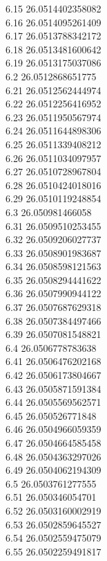 {6.15	26.0514402358082\\
6.16	26.0514095261409\\
6.17	26.0513788342172\\
6.18	26.0513481600642\\
6.19	26.0513175037086\\
6.2	26.0512868651775\\
6.21	26.0512562444974\\
6.22	26.0512256416952\\
6.23	26.0511950567974\\
6.24	26.0511644898306\\
6.25	26.0511339408212\\
6.26	26.0511034097957\\
6.27	26.0510728967804\\
6.28	26.0510424018016\\
6.29	26.0510119248854\\
6.3	26.050981466058\\
6.31	26.0509510253455\\
6.32	26.0509206027737\\
6.33	26.0508901983687\\
6.34	26.0508598121563\\
6.35	26.0508294441622\\
6.36	26.0507990944122\\
6.37	26.0507687629318\\
6.38	26.0507384497466\\
6.39	26.0507081548821\\
6.4	26.0506778783638\\
6.41	26.0506476202168\\
6.42	26.0506173804667\\
6.43	26.0505871591384\\
6.44	26.0505569562571\\
6.45	26.050526771848\\
6.46	26.0504966059359\\
6.47	26.0504664585458\\
6.48	26.0504363297026\\
6.49	26.0504062194309\\
6.5	26.0503761277555\\
6.51	26.050346054701\\
6.52	26.0503160002919\\
6.53	26.0502859645527\\
6.54	26.0502559475079\\
6.55	26.0502259491817\\
}
